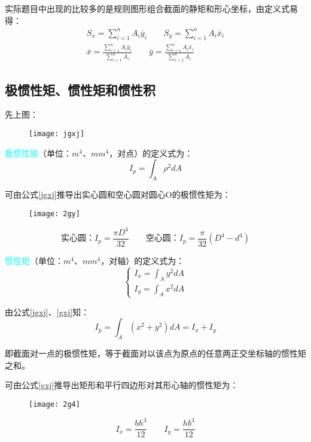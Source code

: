 \documentclass[10pt,a4paper]{ctexart}
\begin{document}
实际题目中出现的比较多的是规则图形组合截面的静矩和形心坐标，由定义式易得：
\begin{gather}
	S_x=\sum_{i=1}^n A_i\bar{y}_i \qquad S_y=\sum_{i=1}^n A_i\bar{x}_i\\
	\bar{x}=\frac{\sum\limits_{i=1}^n A_i\bar{y}_i}{\sum\limits_{i=1}^n A_i} \qquad \bar{y}=\frac{\sum\limits_{i=1}^n A_i\bar{x}_i}{\sum\limits_{i=1}^n A_i}
\end{gather}	
		
\subsection{极惯性矩、惯性矩和惯性积}
先上图：
\begin{figure}[htp]%
	\centering
	\texttt{[image: jgxj]}
\end{figure}

\textcolor{cyan}{极惯性矩}（单位：$m^4$、$mm^4$，对点）的定义式为：
\begin{equation}
	I_p=\int_A\rho^2dA
	\label{jgxj}
\end{equation}

可由公式\ref{jgxj}推导出实心圆和空心圆对圆心O的极惯性矩为：
\begin{figure}[htp]%
	\centering
	\texttt{[image: 2gy]}
\end{figure}

\begin{equation}%
\mbox{实心圆：} I_p=\frac{\pi D^4}{32} \qquad \mbox{空心圆：} I_p=\frac{\pi}{32}(D^4-d^4)
\label{yjgxj}
\end{equation}

\textcolor{cyan}{惯性矩}（单位：$m^4$、$mm^4$，对轴）的定义式为：
\begin{equation}
\begin{cases}
I_x=\int_A y^2dA\\
I_y=\int_A x^2dA
\end{cases}
\label{gxj}
\end{equation}

由公式\ref{jgxj}、\ref{gxj}知：
\begin{equation}
	I_p=\int_A(x^2+y^2)dA=I_x+I_y
\end{equation}

即截面对一点的极惯性矩，等于截面对以该点为原点的任意两正交坐标轴的惯性矩之和。

可由公式\ref{gxj}推导出矩形和平行四边形对其形心轴的惯性矩为：
\begin{figure}[htp]%
	\centering
	\texttt{[image: 2g4]}
\end{figure}
\begin{equation}
	I_x=\frac{bh^3}{12} \qquad I_y=\frac{hb^3}{12}
	\label{jg}
\end{equation}
\end{document}

